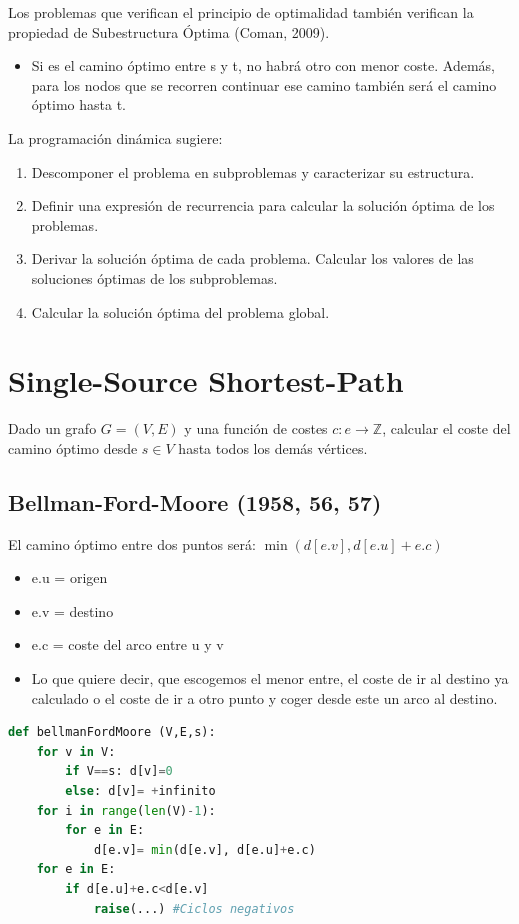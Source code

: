 \documentclass[12pt, twoside, openright]{report} %
\begin{document}
Los problemas que verifican el principio de optimalidad también
verifican la propiedad de Subestructura Óptima (Coman, 2009).

\begin{itemize}
	\item Si es el camino óptimo entre s y t, no habrá otro con menor coste.
	      Además, para los nodos que se recorren continuar ese camino
	      también será el camino óptimo hasta t.
\end{itemize}

La programación dinámica sugiere:

\begin{enumerate}
	\item Descomponer el problema en subproblemas y caracterizar su
	      estructura.
	\item Definir una expresión de recurrencia para calcular la solución
	      óptima de los problemas.
	\item Derivar la solución óptima de cada problema. Calcular los valores
	      de las soluciones óptimas de los subproblemas.
	\item Calcular la solución óptima del problema global.
\end{enumerate}
\pagebreak

\section{Single-Source Shortest-Path}


Dado un grafo \(G=(V,E)\) y una función de costes \(c: e → \mathbb{Z}\),
calcular el coste del camino óptimo desde \(s \in V\) hasta todos los
demás vértices.

\subsection{Bellman-Ford-Moore (1958, 56, 57)}

El camino óptimo entre dos puntos será: \(\min (d[e.v], d[e.u]+ e.c)\)

\begin{itemize}
	\item e.u = origen
	\item e.v = destino
	\item e.c = coste del arco entre u y v
	\item Lo que quiere decir, que escogemos el menor entre, el coste de ir al
	      destino ya calculado o el coste de ir a otro punto y coger desde
	      este un arco al destino.
\end{itemize}
\begin{lstlisting}[language=Python]
def bellmanFordMoore (V,E,s):
	for v in V:
		if V==s: d[v]=0
		else: d[v]= +infinito
	for i in range(len(V)-1):
		for e in E:
			d[e.v]= min(d[e.v], d[e.u]+e.c)
	for e in E:
		if d[e.u]+e.c<d[e.v]
			raise(...) #Ciclos negativos
\end{lstlisting}
\end{document}
